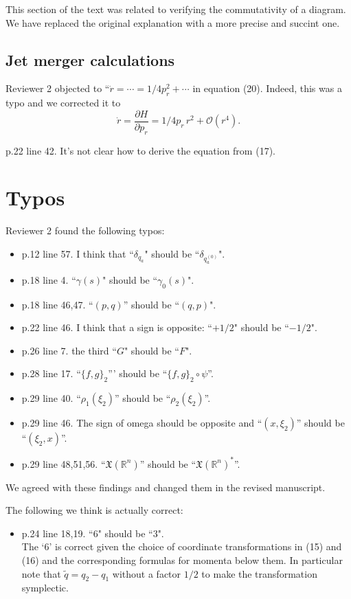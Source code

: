 \documentclass{article}
\begin{document}
This section of the text was related to verifying the commutativity of a diagram.  We have replaced the original explanation with a more precise and succint one.

\subsection{Jet merger calculations}
Reviewer 2 objected to ``$\dot{r} = \cdots = 1/4 p_r^2 + \cdots$ in
equation (20). Indeed, this was a typo and we corrected it to
\begin{equation*}
  \dot{r} = \frac{\partial H}{\partial p_r} = 1/4 p_r\,r^2 + \mathcal{O}(r^4).
\end{equation*}

p.22 line 42. It's not clear how to derive the equation from (17). 
\\

\section{Typos}
Reviewer 2 found the following typos:
\begin{itemize}
 \item p.12 line 57. I think that ``$\delta_{q_a}$" should be ``$\delta_{q_a^{(0)}}$". 
\item p.18 line 4. ``$\gamma(s)$" should be ``$\gamma_0(s)$". 
\item p.18 line 46,47. ``$(p, q)$'' should be ``$(q, p)$". 
\item p.22 line 46. I think that a sign is opposite: ``$+ 1/2$" should be ``$-1/2$".
\item p.26 line 7. the third ``$G$" should be ``$F$".  
\item p.28 line 17. ``$\{f, g \}_2$''' should be ``$\{f, g \}_2 \circ \psi$''. 
\item p.29 line 40. ``$\rho_1(\xi_2)$'' should be ``$\rho_2(\xi_2)$''. 
\item p.29 line 46. The sign of omega should be opposite and ``$(x, \xi_2)$'' 
should be ``$(\xi_2, x)$''. 
\\
\item p.29 line 48,51,56. 
``$\mathfrak{X}(\mathbb{R}^n)$'' should be 
``$\mathfrak{X}(\mathbb{R}^n)^*$''. 
\end{itemize}

We agreed with these findings and changed them in the revised manuscript.

The following we think is actually correct:
\begin{itemize}
\item p.24 line 18,19. ``$6$" should be ``$3$".\\
  The `$6$' is correct given the choice of coordinate
  transformations in (15) and (16) and the corresponding formulas for
  momenta below them. In particular note that $\tilde{q} = q_2 - q_1$
  without a factor $1/2$ to make the transformation symplectic.
\end{itemize}
\end{document}
